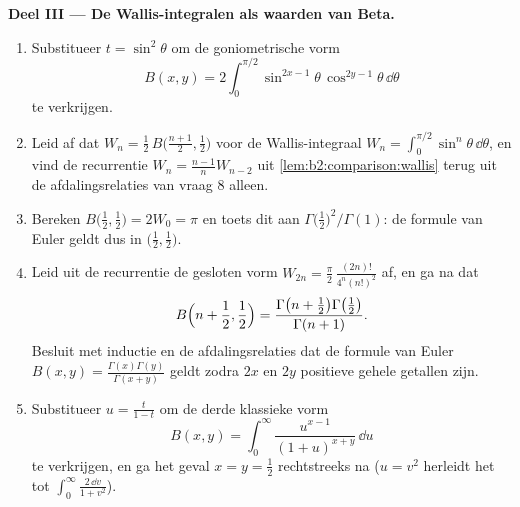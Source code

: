 \begin{problem}
\medskip
\noindent\textbf{Deel III --- De Wallis-integralen als waarden van
Beta.}
\begin{enumerate}[resume]
  \item Substitueer $t = \sin^2\theta$ om de goniometrische vorm
        \[
        B(x, y) = 2\int_0^{\pi/2}
        \sin^{2x-1}\theta\,\cos^{2y-1}\theta\,\dd\theta
        \]
        te verkrijgen.
  \item Leid af dat $W_n = \frac12\,B\bigl(\frac{n+1}2,
        \frac12\bigr)$ voor de Wallis-integraal $W_n =
        \int_0^{\pi/2}\sin^n \theta\,\dd\theta$, en vind de
        recurrentie $W_n = \frac{n-1}{n}W_{n-2}$ uit
        \cref{lem:b2:comparison:wallis} terug uit de
        afdalingsrelaties van vraag 8 alleen.
  \item Bereken $B\bigl(\frac12, \frac12\bigr) = 2W_0 = \pi$ en
        toets dit aan $\Gamma\bigl(\frac12\bigr)^2/\Gamma(1)$: de
        formule van Euler geldt dus in $\bigl(\frac12,
        \frac12\bigr)$.
  \item Leid uit de recurrentie de gesloten vorm $W_{2n} =
        \frac\pi2\, \frac{(2n)!}{4^n(n!)^2}$ af, en ga na dat
        \[
        B\Bigl(n + \frac12, \frac12\Bigr)
        = \frac{\Gamma\bigl(n + \frac12\bigr)\Gamma\bigl(
        \frac12\bigr)}{\Gamma(n+1)} .
        \]
        Besluit met inductie en de afdalingsrelaties dat de formule
        van Euler $B(x,y) =
        \frac{\Gamma(x)\Gamma(y)}{\Gamma(x+y)}$ geldt zodra $2x$
        en $2y$ positieve gehele getallen zijn.
  \item Substitueer $u = \frac{t}{1-t}$ om de derde klassieke vorm
        \[
        B(x,y) = \int_0^\infty
        \frac{u^{x-1}}{(1+u)^{x+y}}\,\dd u
        \]
        te verkrijgen, en ga het geval $x = y = \frac12$
        rechtstreeks na ($u = v^2$ herleidt het tot
        $\int_0^\infty\frac{2\,\dd v}{1+v^2}$).
\end{enumerate}


\end{problem}
